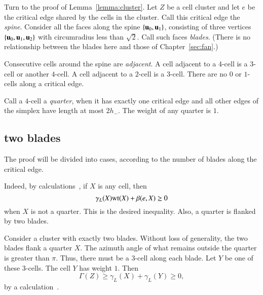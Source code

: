 Turn to the proof of Lemma~\ref{lemma:cluster}.   Let $Z$ be a cell cluster and let $e$ be the  critical edge shared by the cells in the cluster.   Call this critical edge the {\it spine}.  Consider all the faces along the spine $\{ {\mathbf u}_0, {\mathbf u}_1\}$, consisting of three vertices $\{ {\mathbf u}_0, {\mathbf u}_1, {\mathbf u}_2\}$ with circumradius less than $\sqrt2$.  Call such faces {\it blades}.  (There is no relationship between the blades here and those of Chapter~\ref{sec:fan}.)
%
%
%

Consecutive cells around the spine are {\it adjacent}.
A cell adjacent to a $4$-cell is a $3$-cell or another $4$-cell.  A cell adjacent to a $2$-cell is a $3$-cell.  There are no $0$ or $1$-cells along a critical edge.
%
%

Call a $4$-cell a {\it quarter}, when it has exactly one critical edge and all other edges of the simplex have length at most $2 h_-$.  The weight of any quarter is $1$.





\subsection{two blades}

The proof will be divided into cases, according to the number of blades along the critical edge.

 Indeed,
by calculations~\cite[GLFVCVK]{hales:2009:nonlinear}, if $X$ is any cell, then %
$$
 \gamma_L(X) {\operatorname{wt}}(X) + \beta(e,X)\ge 0
$$ 
when $X$ is not a quarter.  This is the desired inequality.  Also, a quarter is flanked by two blades.

Consider a cluster with exactly two blades.
Without loss of generality, the two blades flank a quarter
$X$. 
The azimuth angle of what remains outside the quarter
is greater than $\pi$.  Thus, there must be a $3$-cell
along each blade.  Let $Y$ be one of these $3$-cells.
The cell $Y$ has weight $1$.
Then 
\begin{equation}\label{eqn:34}
\Gamma(Z)\ge \gamma_L(X)+\gamma_L(Y)\ge 0,
\end{equation}
by a calculation~\cite[FHBVYXZ]{hales:2009:nonlinear}. %
%
%




